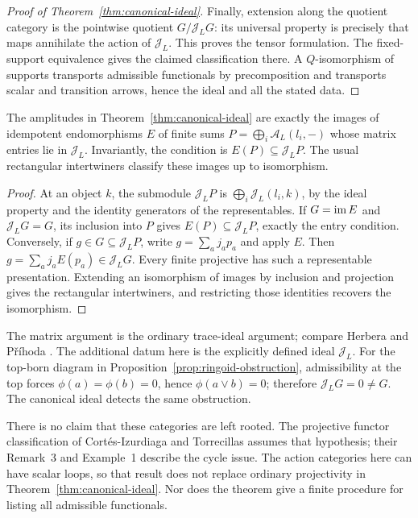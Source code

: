 \begin{proof}[Proof of Theorem~\ref{thm:canonical-ideal}]
Finally, extension along the quotient category is the pointwise quotient
$G/\mathcal J_LG$: its universal property is precisely that maps annihilate
the action of $\mathcal J_L$. This proves the tensor formulation.
The fixed-support equivalence gives the claimed classification there.
A $Q$-isomorphism of supports transports admissible functionals by
precomposition and transports scalar and transition arrows, hence the
ideal and all the stated data.
\end{proof}

\begin{corollary}
\label{cor:canonical-ideal-matrices}
The amplitudes in Theorem~\ref{thm:canonical-ideal} are exactly the images
of idempotent endomorphisms $E$ of finite sums
$P=\bigoplus_i\mathcal A_L(l_i,-)$ whose matrix entries lie in
$\mathcal J_L$. Invariantly, the condition is $E(P)\subseteq\mathcal J_LP$.
The usual rectangular intertwiners classify these images up to isomorphism.
\end{corollary}
\begin{proof}
At an object $k$, the submodule $\mathcal J_LP$ is
$\bigoplus_i\mathcal J_L(l_i,k)$, by the ideal property and the identity
generators of the representables. If $G=\operatorname{im} E$ and $\mathcal J_LG=G$,
its inclusion into $P$ gives $E(P)\subseteq\mathcal J_LP$, exactly the
entry condition. Conversely, if $g\in G\subseteq\mathcal J_LP$, write
$g=\sum_a j_ap_a$ and apply $E$. Then
$g=\sum_a j_aE(p_a)\in\mathcal J_LG$.
Every finite projective has such a representable presentation.
Extending an isomorphism of images by inclusion and projection gives
the rectangular intertwiners, and restricting those identities recovers
the isomorphism.
\end{proof}
The matrix argument is the ordinary trace-ideal argument; compare
Herbera and P\v r\'ihoda \cite[p.~2 of the preprint]{HerberaPrihoda}.
The additional datum here is the explicitly defined ideal
$\mathcal J_L$. For the top-born diagram in
Proposition~\ref{prop:ringoid-obstruction}, admissibility at the top
forces $\phi(a)=\phi(b)=0$, hence $\phi(a\vee b)=0$; therefore
$\mathcal J_LG=0\ne G$. The canonical ideal detects the same obstruction.

There is no claim that these categories are left rooted. The projective
functor classification of Cort\'es-Izurdiaga and Torrecillas
\cite[Theorem~1, pp.~320--322]{CortesTorrecillas} assumes that hypothesis;
their Remark~3 and Example~1 describe the cycle issue. The action
categories here can have scalar loops, so that result does not replace
ordinary projectivity in Theorem~\ref{thm:canonical-ideal}. Nor does the
theorem give a finite procedure for listing all admissible functionals.
